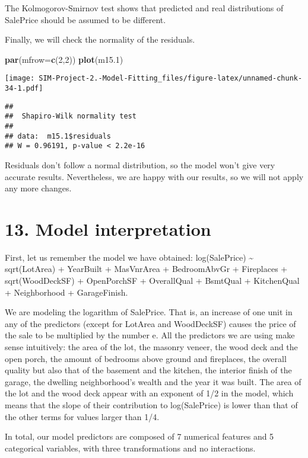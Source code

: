 \documentclass[
]{article}
\newenvironment{Shaded}{\begin{snugshade}}{\end{snugshade}}
\newcommand{\AttributeTok}[1]{\textcolor[rgb]{0.13,0.29,0.53}{#1}}
\newcommand{\DecValTok}[1]{\textcolor[rgb]{0.00,0.00,0.81}{#1}}
\newcommand{\FloatTok}[1]{\textcolor[rgb]{0.00,0.00,0.81}{#1}}
\newcommand{\FunctionTok}[1]{\textcolor[rgb]{0.13,0.29,0.53}{\textbf{#1}}}
\newcommand{\NormalTok}[1]{#1}
\newcommand{\SpecialCharTok}[1]{\textcolor[rgb]{0.81,0.36,0.00}{\textbf{#1}}}
\begin{document}
The Kolmogorov-Smirnov test shows that predicted and real distributions
of SalePrice should be assumed to be different.

Finally, we will check the normality of the residuals.

\begin{Shaded}
\begin{Highlighting}[]
\FunctionTok{par}\NormalTok{(}\AttributeTok{mfrow=}\FunctionTok{c}\NormalTok{(}\DecValTok{2}\NormalTok{,}\DecValTok{2}\NormalTok{))}
\FunctionTok{plot}\NormalTok{(m15}\FloatTok{.1}\NormalTok{)}
\end{Highlighting}
\end{Shaded}

\texttt{[image: SIM-Project-2.-Model-Fitting\_files/figure-latex/unnamed-chunk-34-1.pdf]}

\begin{Shaded}
\end{Shaded}

\begin{verbatim}
## 
##  Shapiro-Wilk normality test
## 
## data:  m15.1$residuals
## W = 0.96191, p-value < 2.2e-16
\end{verbatim}

Residuals don't follow a normal distribution, so the model won't give
very accurate results. Nevertheless, we are happy with our results, so
we will not apply any more changes.

\hypertarget{model-interpretation}{%
\section{13. Model interpretation}\label{model-interpretation}}

First, let us remember the model we have obtained: log(SalePrice)
\textasciitilde{} sqrt(LotArea) + YearBuilt + MasVnrArea + BedroomAbvGr
+ Fireplaces + sqrt(WoodDeckSF) + OpenPorchSF + OverallQual + BsmtQual +
KitchenQual + Neighborhood + GarageFinish.

We are modeling the logarithm of SalePrice. That is, an increase of one
unit in any of the predictors (except for LotArea and WoodDeckSF) causes
the price of the sale to be multiplied by the number e. All the
predictors we are using make sense intuitively: the area of the lot, the
masonry veneer, the wood deck and the open porch, the amount of bedrooms
above ground and fireplaces, the overall quality but also that of the
basement and the kitchen, the interior finish of the garage, the
dwelling neighborhood's wealth and the year it was built. The area of
the lot and the wood deck appear with an exponent of 1/2 in the model,
which means that the slope of their contribution to log(SalePrice) is
lower than that of the other terms for values larger than 1/4.

In total, our model predictors are composed of 7 numerical features and
5 categorical variables, with three transformations and no interactions.
\end{document}
